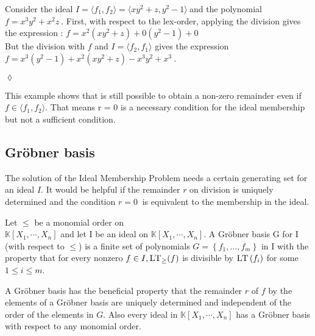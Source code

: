\begin{env_example}\normalfont
Consider the ideal $I = \langle f_{1},f_{2} \rangle = \langle xy^{2}+z,y^{2}-1 \rangle~$and the polynomial $f = x^{3}y^{2}+x^{2}z~$.
First, with respect to the lex-order, applying the division gives the expression : $f = x^{2}(xy^{2}+z) + 0(y^{2}-1) + 0$ \\
But the division with $f$ and $I = \langle f_{2},f_{1} \rangle$ gives the expression \\ $f = x^{3}(y^{2}-1) + x^{2}(xy^{2}+z) -x^{3}y^{2}+x^{3}~$.
\begin{flushright}
$\lozenge$
\end{flushright}
\end{env_example}



This example shows that is still possible to obtain a non-zero remainder even if $f \in \langle f_{1},f_{2} \rangle $. That means r = 0 is a  necessary condition for the ideal membership but not a sufficient condition.
\subsection{Gröbner basis}
\label{subsec:Groebner}

The solution of the Ideal Membership Problem needs a certain generating set for an ideal $I$. It would be helpful if the remainder $r$ on division is uniquely determined and the condition $ r = 0~$ is equivalent to the membership in the ideal.



\begin{env_definition}
\cite{KHZ}
Let $\leq$ be a monomial order on \\ $\mathbb{K}\left[X_{1}, \cdots, X_{n}\right]$ and let I be an ideal on $ \mathbb{K}\left[X_{1}, \cdots, X_{n}\right]  $. A Gröbner basis G for I (with respect to $\leq$) is a finite set of polynomials $ G = \left\lbrace f_{1}, \ldots , f_{m} \right\rbrace $ in I with the property that for every nonzero $ f \in I , \textsc{LT}_{\geq}(f) $ is divisible by $\textsc{LT}\left( f_{i}\right) $ for some $ 1 \leq i \leq m $.

\end{env_definition}

A Gröbner basis has the beneficial property that the remainder $r$ of $f$ by the elements of a Gröbner basis are uniquely determined and independent of the order of the elements in $G$.
Also every ideal in $\mathbb{K}\left[X_{1}, \cdots, X_{n}\right]$ has a Gröbner basis with respect to any monomial order\cite{KHZ}.\\ 


